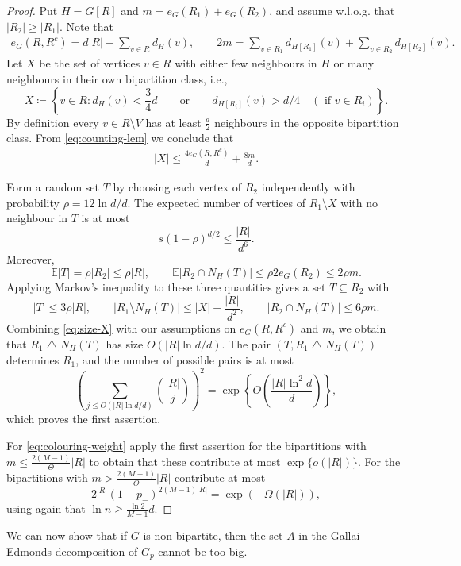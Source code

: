 \documentclass[10pt,a4paper]{article}
\begin{document}
\begin{proof}
Put $H=G[R]$ and $m=e_G(R_1)+e_G(R_2)$, and assume w.l.o.g. that $|R_2|\ge|R_1|$.
Note that
\begin{align} \label{eq:counting-lem}
   e_G(R, R^c)=d|R|- \sum_{v \in R} d_H(v), \qquad 2m= \sum_{v \in R_1} d_{H[R_1]} (v) + \sum_{v \in R_2} d_{H[R_2]}(v). 
\end{align}
Let $X$ be the set of vertices $v \in R$ with either few neighbours in $H$ or many neighbours in their own bipartition class, i.e.,
\[
 X\coloneqq \left\{v \in R: d_H(v)<\frac{3}{4}d \qquad\text{or}\qquad  d_{H[R_i]}(v)>d/4\quad( \text{ if } v\in R_i)\right\}.
\]
By definition every $v \in R\setminus V$ has at least $\frac{d}{2}$ neighbours in the opposite bipartition class.
From \eqref{eq:counting-lem} we conclude that
\begin{align} \label{eq:size-X}
    |X| \leq \frac{4 e_G(R, R^c)}{d} + \frac{8m}{d}.
\end{align}

Form a random set $T$ by choosing each vertex of $R_2$ independently with probability $\rho=12\ln d/d$. The expected number of vertices of $R_1\setminus X$ with no neighbour in $T$ is at most
\[
 s(1-\rho)^{d/2}\le \frac{|R|}{d^6}.
\]
Moreover,
\[
 \mathbb{E}|T|= \rho |R_2| \le\rho |R|,
 \qquad
 \mathbb{E}|R_2\cap N_H(T)|\le\rho 2 e_G(R_2)\le2\rho m.
\]
Applying Markov's inequality to these three quantities gives a set $T\subseteq R_2$ with
\[
 |T|\le3\rho |R|,
 \qquad
 |R_1\setminus N_H(T)|\le |X| + \frac{|R|}{d^2},
 \qquad
 |R_2\cap N_H(T)|\le6\rho m.
\]
Combining \eqref{eq:size-X} with our assumptions on $e_G(R, R^c)$ and $m$, we obtain that $R_1\mathbin{\triangle}N_H(T)$ has size $O(|R|\ln d/d)$.
The pair $(T, R_1\mathbin{\triangle}N_H(T))$ determines $R_1$, and the number of possible pairs is at most
\[
 \left(\sum_{j \le O(|R|\ln d/d)}\binom{|R|}{j}\right)^2
 =\exp\left\{O\left(\frac{|R|\ln^2 d}{d}\right)\right\},
\]
which proves the first assertion.

For \eqref{eq:colouring-weight} apply the first assertion for the bipartitions with $m\le \frac{2(M-1)}{\Theta} |R|$ to obtain that these contribute at most $\exp\{o(|R |)\}$. For the bipartitions with $m>\frac{2(M-1)}{ \Theta} |R|$ contribute at most
\[
 2^{|R|} (1-p_-)^{2 (M-1) |R|}=\exp\left(- \Omega(|R|) \right),
\]
using again that $\ln n \geq \frac{\ln 2}{M-1} d$.
\end{proof}
We can now show that if $G$ is non-bipartite, then the set $A$ in the Gallai-Edmonds decomposition of $G_p$ cannot be too big.
\end{document}
